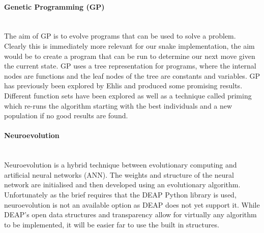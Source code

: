 \documentclass[12pt]{article}
\newcommand{\myparagraph}[1]{\paragraph{#1}\mbox{}\\}
\begin{document}

\myparagraph{Genetic Programming (GP)}
The aim of GP is to evolve programs that can be used to solve a problem. Clearly this is immediately more relevant for our snake implementation, the aim would be to create a program that can be run to determine our next move given the current state. GP uses a tree representation for programs, where the internal nodes are functions and the leaf nodes of the tree are constants and variables. GP has previously been explored by Ehlis\cite{snake_blog} and produced some promising results. Different function sets have been explored as well as a technique called priming which re-runs the algorithm starting with the best individuals and a new population if no good results are found.

\myparagraph{Neuroevolution}
Neuroevolution is a hybrid technique between evolutionary computing and artificial neural networks (ANN). The weights and structure of the neural network are initialised and then developed using an evolutionary algorithm. Unfortunately as the brief requires that the DEAP Python library is used, neuroevolution is not an available option as DEAP does not yet support it. While DEAP's open data structures and transparency allow for virtually any algorithm to be implemented, it will be easier far to use the built in structures.
\end{document}
